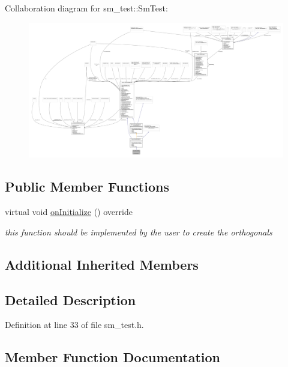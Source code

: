Collaboration diagram for sm\+\_\+test\+:\+:Sm\+Test\+:
\nopagebreak
\begin{figure}[H]
\begin{center}
\leavevmode
\includegraphics[width=350pt]{structsm__test_1_1SmTest__coll__graph}
\end{center}
\end{figure}
\subsection*{Public Member Functions}
\begin{DoxyCompactItemize}
\item 
virtual void \hyperlink{structsm__test_1_1SmTest_afc961fbf2c09cd83a112875ba290795c}{on\+Initialize} () override
\begin{DoxyCompactList}\small\item\em this function should be implemented by the user to create the orthogonals \end{DoxyCompactList}\end{DoxyCompactItemize}
\subsection*{Additional Inherited Members}


\subsection{Detailed Description}


Definition at line 33 of file sm\+\_\+test.\+h.



\subsection{Member Function Documentation}
\mbox{\label{structsm__test_1_1SmTest_afc961fbf2c09cd83a112875ba290795c}} 

